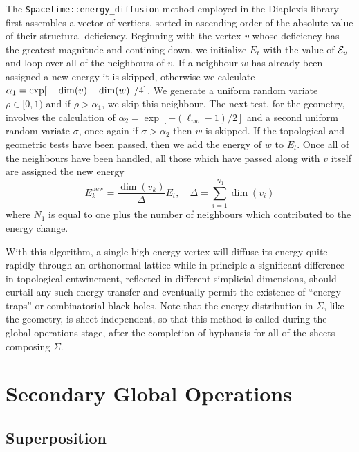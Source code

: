 \documentclass[12pt,letterpaper]{report}
\begin{document}
The \texttt{Spacetime::energy\_diffusion} method employed in the Diaplexis library first assembles a vector of 
vertices, sorted in ascending order of the absolute value of their structural deficiency. Beginning with 
the vertex $v$ whose deficiency has the greatest magnitude and contining down, we initialize $E_t$ with the 
value of ${\cal E}_v$ and loop over all of the neighbours of $v$. If a neighbour $w$ has already been 
assigned a new energy it is skipped, otherwise we calculate $\alpha_1 = \exp[-\left\lvert\dim(v) - \dim(w)\right\rvert/4]$. 
We generate a uniform random variate $\rho\in [0,1)$ and if $\rho > \alpha_1$, we skip this neighbour. The 
next test, for the geometry, involves the calculation of $\alpha_2 = \exp[-(\ell_{vw}-1)/2]$ and a second 
uniform random variate $\sigma$, once again if $\sigma > \alpha_2$ then $w$ is skipped. If the topological 
and geometric tests have been passed, then we add the energy of $w$ to $E_t$. Once all of the neighbours 
have been handled, all those which have passed along with $v$ itself are assigned the new energy 
\begin{equation}
E^\text{new}_k = \frac {\dim(v_k)}{\Delta} E_t, \quad \Delta = \sum_{i=1}^{N_1} \dim(v_i)       
\end{equation}
where $N_1$ is equal to one plus the number of neighbours which contributed to the energy change. 

With this algorithm, a single high-energy vertex will diffuse its energy quite rapidly through an 
orthonormal lattice while in principle a significant difference in topological entwinement, reflected 
in different simplicial dimensions, should curtail any such energy transfer and eventually permit the 
existence of ``energy traps'' or combinatorial black holes. Note that the energy distribution 
in $\Sigma$, like the geometry, is sheet-independent, so that this method is called during the global 
operations stage, after the completion of hyphansis for all of the sheets composing $\Sigma$.  

\section{Secondary Global Operations}

\subsection{Superposition}
\end{document}
